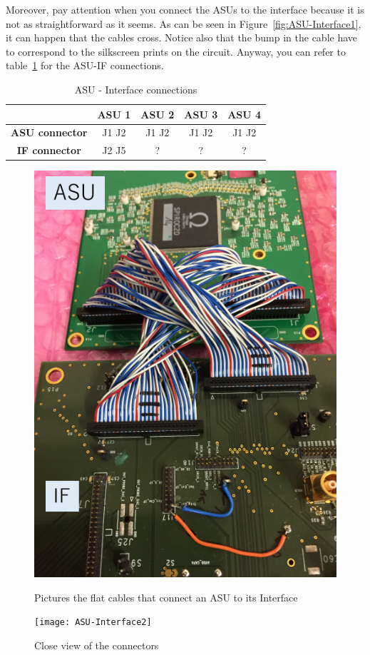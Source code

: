 Moreover, pay attention when you connect the ASUs to the interface because it is
not as straightforward as it seems. As can be seen in
Figure~\ref{fig:ASU-Interface1}, it can happen that the cables cross. Notice
also that the bump in the cable have to correspond to the silkscreen prints on
the circuit. Anyway, you can refer to table~\ref{tab:ASU-IF} for the ASU-IF
connections.
\begin{table}[H]
  \centering \bgroup
  \def\arraystretch{1.5}%
  \begin{tabular}{|c|c|c|c|c|}
    \hline
    & \textbf{ASU 1} & \textbf{ASU 2} & \textbf{ASU 3} & \textbf{ASU 4} \\
    \hline
    \textbf{ASU connector} & J1 J2 & J1 J2 & J1 J2 & J1 J2  \\
    \hline
    \textbf{IF connector} & J2 J5 & ? & ? & ?  \\ %
    \hline
  \end{tabular}
  \egroup
  \caption{ASU - Interface connections}\label{tab:ASU-IF}
\end{table}
\begin{figure}[ht]
  \centering
  \begin{minipage}{0.4\linewidth}
    \centering \includegraphics[width=0.9\linewidth,frame]{ASU-Interface1}
    \caption{Pictures the flat cables that connect an ASU to its
      Interface}\label{fig:ASU-Interface1}
  \end{minipage}%
  \begin{minipage}{0.5\linewidth}
    \centering \texttt{[image: ASU-Interface2]}
    \caption{Close view of the connectors}\label{fig:ASU-Interface2}
  \end{minipage}
\end{figure}

